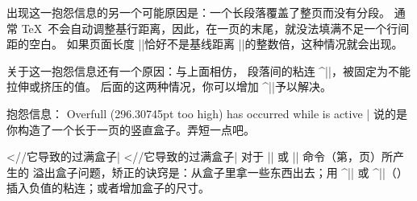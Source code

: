 
出现这一抱怨信息的另一个可能原因是：一个长段落覆盖了整页而没有分段。
通常 \TeX\ 不会自动调整基行距离，因此，在一页的末尾，就没法填满不足一个行间距的空白。
如果页面长度 |\vsize|\ctsref{\vsize}恰好不是基线距离
|\baselineskip|\ctsref{\baselineskip}的整数倍，这种情况就会出现。


关于这一抱怨信息还有一个原因：与上面相仿，
段落间的粘连 ^|\parskip|\ctsref{\parskip}，被固定为不能拉伸或挤压的值。
后面的这两种情况，你可以增加 ^|\vfuzz|\ctsref\vfuzz 予以解决。


\li 抱怨信息：
\csdisplay
Overfull \vbox (296.30745pt too high) has occurred
   while \output is active
|
说的是你构造了一个长于一页的竖直盒子。弄短一点吧。


\li
\bix^^|\hbox//它导致的过满盒子|
\bix^^|\vbox//它导致的过满盒子|
对于 |\hbox| 或 |\vbox| 命令（第\xrefn\hbox ，\xrefn\vbox 页）所产生的
溢出盒子问题，矫正的诀窍是：从盒子里拿一些东西出去；用 ^|\hss| 或 ^|\vss|（\xref\hss ）
插入负值的粘连；或者增加盒子的尺寸。


